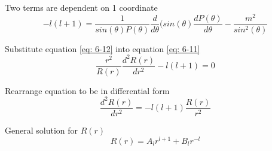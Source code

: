 \documentclass[English]{article}
\begin{document}
    Two terms are dependent on 1 coordinate
    \begin{equation} \label{eq: 6-12}
        -l(l+1) = \frac{1}{sin(\theta) P(\theta)} \frac{d}{d \theta} (sin(\theta) \frac{d P(\theta)}{d \theta} - \frac{m^2}{sin^2(\theta)}
    \end{equation}

    Substitute equation \ref{eq: 6-12} into equation \ref{eq: 6-11}
    \begin{equation} \label{eq: 6-14}
        \frac{r^2}{R(r)} \frac{d^2 R(r)}{dr^2}-l(l+1) = 0
    \end{equation}

    Rearrange equation to be in differential form
    \begin{equation} \label{eq: 6-15}
        \frac{d^2 R(r)}{dr^2} = -l(l+1)\frac{R(r)}{r^2} 
    \end{equation}

    General solution for $R(r)$
    \begin{equation} \label{6-16}
        R(r) = A_l r^{l+1} + B_l r^{-l}
    \end{equation}





















    
\end{document}
